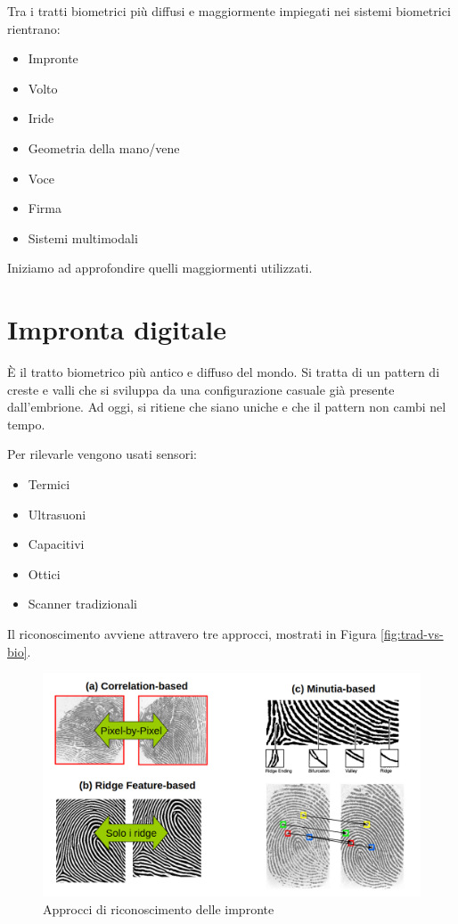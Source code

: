 \documentclass{report}
\begin{document}
Tra i tratti biometrici più diffusi e maggiormente impiegati nei sistemi biometrici rientrano:
\begin{itemize}
    \item Impronte
    \item Volto
    \item Iride
    \item Geometria della mano/vene
    \item Voce
    \item Firma
    \item Sistemi multimodali
\end{itemize}
Iniziamo ad approfondire quelli maggiormenti utilizzati.

\section{Impronta digitale}
È il tratto biometrico più antico e diffuso del mondo. Si tratta di un pattern di creste e valli che si sviluppa da una configurazione casuale già presente dall'embrione. Ad oggi, si ritiene che siano uniche e che il pattern non cambi nel tempo.

Per rilevarle vengono usati sensori:
\begin{itemize}
    \item Termici
    \item Ultrasuoni
    \item Capacitivi
    \item Ottici
    \item Scanner tradizionali
\end{itemize}

\noindent Il riconoscimento avviene attravero tre approcci, mostrati in Figura \ref{fig:trad-vs-bio}.

\begin{figure}
    \centering
    \includegraphics[width=1\linewidth]{images/impronte.png}
    \caption{Approcci di riconoscimento delle impronte}
    \label{fig:impronte}
\end{figure}
\end{document}
